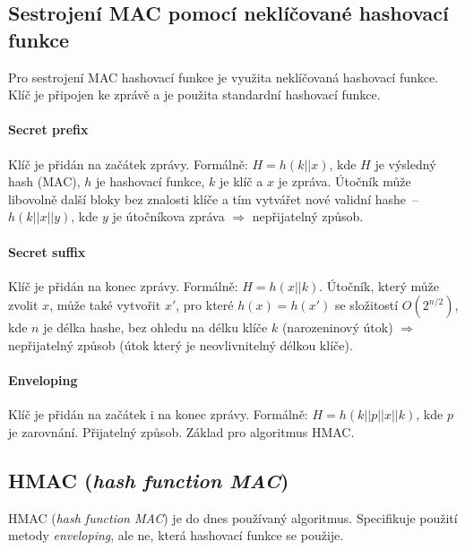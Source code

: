 \subsection{Sestrojení MAC pomocí neklíčované hashovací funkce}

Pro sestrojení MAC hashovací funkce je využita neklíčovaná hashovací funkce. Klíč je připojen ke zprávě a je použita standardní hashovací funkce.

\paragraph*{Secret prefix} Klíč je přidán na začátek zprávy. Formálně: $H = h(k || x)$, kde $H$ je výsledný hash (MAC), $h$ je hashovací funkce, $k$ je klíč a $x$ je zpráva. Útočník může libovolně  další bloky bez znalosti klíče a tím vytvářet nové validní hashe~--~$h(k || x || y)$, kde $y$ je útočníkova zpráva $\Rightarrow$ nepřijatelný způsob.

\paragraph*{Secret suffix} Klíč je přidán na konec zprávy. Formálně: $H = h(x || k)$. Útočník, který může zvolit $x$, může také vytvořit $x'$, pro které $h(x) = h(x')$ se složitostí $O(2^{n/2})$, kde $n$ je délka hashe, bez ohledu na délku klíče $k$ (narozeninový útok) $\Rightarrow$ nepřijatelný způsob (útok který je neovlivnitelný délkou klíče).

\paragraph*{Enveloping} Klíč je přidán na začátek i na konec zprávy. Formálně: $H = h(k || p || x || k)$, kde $p$ je zarovnání. Přijatelný způsob. Základ pro algoritmus HMAC.

\subsection{HMAC (\textit{hash function MAC})}

HMAC (\textit{hash function MAC}) je do dnes používaný algoritmus. Specifikuje použití metody \textit{enveloping}, ale ne, která hashovací funkce se použije.

